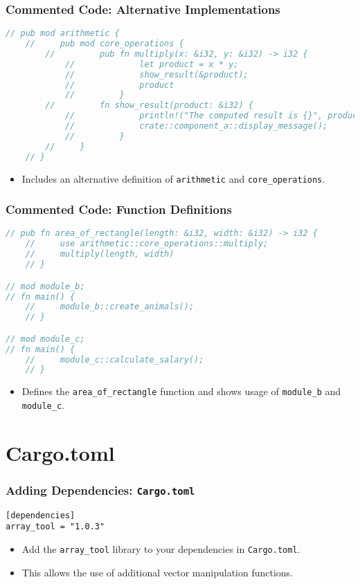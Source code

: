 \documentclass[aspectratio=169, table]{beamer}
\begin{document}
\begin{frame}[fragile]
\frametitle{Commented Code: Alternative Implementations}
\begin{lstlisting}[language=Rust]
// pub mod arithmetic {
	//     pub mod core_operations {
		//         pub fn multiply(x: &i32, y: &i32) -> i32 {
			//             let product = x * y;
			//             show_result(&product);
			//             product
			//         }
		//         fn show_result(product: &i32) {
			//             println!("The computed result is {}", product);
			//             crate::component_a::display_message();
			//         }
		//     }
	// }
\end{lstlisting}
\begin{itemize}
\item Includes an alternative definition of \texttt{arithmetic} and \texttt{core\_operations}.
\end{itemize}
\end{frame}

\begin{frame}[fragile]
\frametitle{Commented Code: Function Definitions}
\begin{lstlisting}[language=Rust]
// pub fn area_of_rectangle(length: &i32, width: &i32) -> i32 {
	//     use arithmetic::core_operations::multiply;
	//     multiply(length, width)
	// }

// mod module_b;
// fn main() {
	//     module_b::create_animals();
	// }

// mod module_c;
// fn main() {
	//     module_c::calculate_salary();
	// }
\end{lstlisting}
\begin{itemize}
\item Defines the \texttt{area\_of\_rectangle} function and shows usage of \texttt{module\_b} and \texttt{module\_c}.
\end{itemize}
\end{frame}


\section{Cargo.toml}
\begin{frame}[fragile]
\frametitle{Adding Dependencies: \texttt{Cargo.toml}}
\begin{lstlisting}
[dependencies]
array_tool = "1.0.3"
\end{lstlisting}
\begin{itemize}
\item Add the \texttt{array\_tool} library to your dependencies in \texttt{Cargo.toml}.
\item This allows the use of additional vector manipulation functions.
\end{itemize}
\end{frame}
\end{document}
